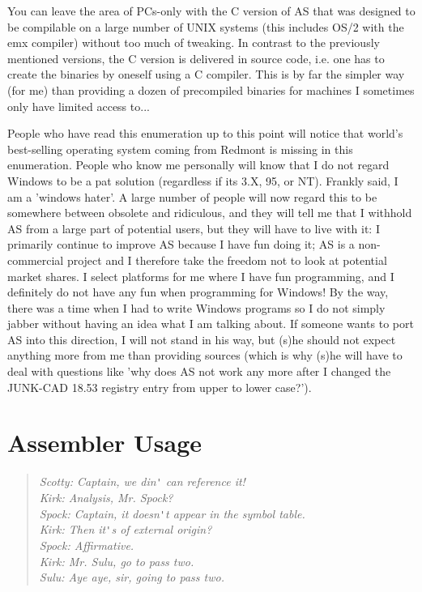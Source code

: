 \documentclass[12pt,twoside]{report}
\begin{document}
You can leave  the area of PCs-only with the C
version of AS that was designed to be compilable on a large number of UNIX
systems (this includes OS/2 with the emx compiler) without too much of
tweaking.  In contrast to the previously mentioned versions, the C version
is delivered in source code, i.e. one has to create the binaries by
oneself using a C compiler.  This is by far the simpler way (for me) than
providing a dozen of precompiled binaries for machines I sometimes only
have limited access to...

People who have read  this enumeration up to this
point will notice that world's best-selling operating system coming from
Redmont is missing in this enumeration.  People who know me personally
will know that I do not regard Windows to be a pat solution (regardless if
its 3.X, 95, or NT).  Frankly said, I am a 'windows hater'.  A large
number of people will now regard this to be somewhere between obsolete and
ridiculous, and they will tell me that I withhold AS from a large part of
potential users, but they will have to live with it: I primarily continue
to improve AS because I have fun doing it; AS is a non-commercial project
and I therefore take the freedom not to look at potential market shares.  I
select platforms for me where I have fun programming, and I definitely do
not have any fun when programming for Windows!  By the way, there was a
time when I had to write Windows programs so I do not simply jabber
without having an idea what I am talking about.  If someone wants to port
AS into this direction, I will not stand in his way, but (s)he should not
expect anything more from me than providing sources (which is why (s)he
will have to deal with questions like 'why does AS not work any more after
I changed the JUNK-CAD 18.53 registry entry from upper to lower case?').


\cleardoublepage
\chapter{Assembler Usage}

\begin{quote}\begin{raggedright}{\it
Scotty: Captain, we din\verb!'! can reference it! \\
Kirk:   Analysis, Mr. Spock? \\
Spock:  Captain, it doesn\verb!'!t appear in the symbol table. \\
Kirk:   Then it\verb!'!s of external origin? \\
Spock:  Affirmative. \\
Kirk:   Mr. Sulu, go to pass two. \\
Sulu:   Aye aye, sir, going to pass two. \\
}\end{raggedright}\end{quote}
\end{document}
